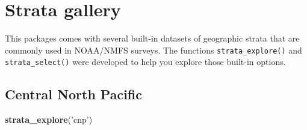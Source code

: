 \documentclass[
]{book}
\newenvironment{Shaded}{\begin{snugshade}}{\end{snugshade}}
\newcommand{\KeywordTok}[1]{\textcolor[rgb]{0.13,0.29,0.53}{\textbf{#1}}}
\newcommand{\NormalTok}[1]{#1}
\newcommand{\StringTok}[1]{\textcolor[rgb]{0.31,0.60,0.02}{#1}}
\begin{document}
\hypertarget{stratagallery}{%
\chapter{Strata gallery}\label{stratagallery}}

This packages comes with several built-in datasets of geographic strata that are commonly used in NOAA/NMFS surveys. The functions \texttt{strata\_explore()} and \texttt{strata\_select()} were developed to help you explore those built-in options.

\hypertarget{central-north-pacific}{%
\section*{Central North Pacific}\label{central-north-pacific}}

\begin{Shaded}
\begin{Highlighting}[]
\KeywordTok{strata_explore}\NormalTok{(}\StringTok{'cnp'}\NormalTok{)}
\end{Highlighting}
\end{Shaded}
\end{document}
